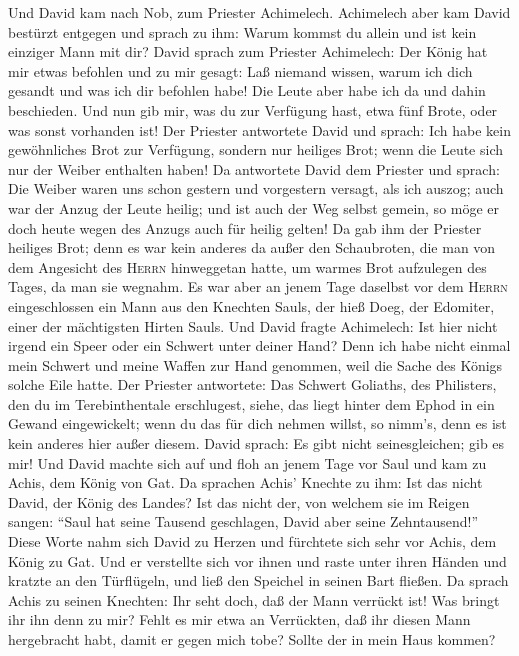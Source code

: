  Und David kam nach Nob, zum Priester Achimelech.
Achimelech aber kam David bestürzt entgegen und sprach zu ihm: Warum
kommst du allein und ist kein einziger Mann mit dir? 
David sprach zum Priester Achimelech: Der König hat mir etwas befohlen
und zu mir gesagt: Laß niemand wissen, warum ich dich gesandt und was
ich dir befohlen habe! Die Leute aber habe ich da und dahin beschieden.
 Und nun gib mir, was du zur Verfügung hast, etwa fünf
Brote, oder was sonst vorhanden ist!  Der Priester
antwortete David und sprach: Ich habe kein gewöhnliches Brot zur
Verfügung, sondern nur heiliges Brot; wenn die Leute sich nur der Weiber
enthalten haben!  Da antwortete David dem Priester und
sprach: Die Weiber waren uns schon gestern und vorgestern versagt, als
ich auszog; auch war der Anzug der Leute heilig; und ist auch der Weg
selbst gemein, so möge er doch heute wegen des Anzugs auch für heilig
gelten!  Da gab ihm der Priester heiliges Brot; denn es
war kein anderes da außer den Schaubroten, die man von dem Angesicht des
\textsc{Herrn} hinweggetan hatte, um warmes Brot aufzulegen des Tages,
da man sie wegnahm.  Es war aber an jenem Tage daselbst
vor dem \textsc{Herrn} eingeschlossen ein Mann aus den Knechten Sauls,
der hieß Doeg, der Edomiter, einer der mächtigsten Hirten Sauls.
 Und David fragte Achimelech: Ist hier nicht irgend ein
Speer oder ein Schwert unter deiner Hand? Denn ich habe nicht einmal
mein Schwert und meine Waffen zur Hand genommen, weil die Sache des
Königs solche Eile hatte.  Der Priester antwortete: Das
Schwert Goliaths, des Philisters, den du im Terebinthentale erschlugest,
siehe, das liegt hinter dem Ephod in ein Gewand eingewickelt; wenn du
das für dich nehmen willst, so nimm's, denn es ist kein anderes hier
außer diesem. David sprach: Es gibt nicht seinesgleichen; gib es mir!
 Und David machte sich auf und floh an jenem Tage vor
Saul und kam zu Achis, dem König von Gat.  Da sprachen
Achis' Knechte zu ihm: Ist das nicht David, der König des Landes? Ist
das nicht der, von welchem sie im Reigen sangen: ``Saul hat seine
Tausend geschlagen, David aber seine Zehntausend!'' 
Diese Worte nahm sich David zu Herzen und fürchtete sich sehr vor Achis,
dem König zu Gat.  Und er verstellte sich vor ihnen und
raste unter ihren Händen und kratzte an den Türflügeln, und ließ den
Speichel in seinen Bart fließen.  Da sprach Achis zu
seinen Knechten: Ihr seht doch, daß der Mann verrückt ist! Was bringt
ihr ihn denn zu mir?  Fehlt es mir etwa an Verrückten,
daß ihr diesen Mann hergebracht habt, damit er gegen mich tobe? Sollte
der in mein Haus kommen?

